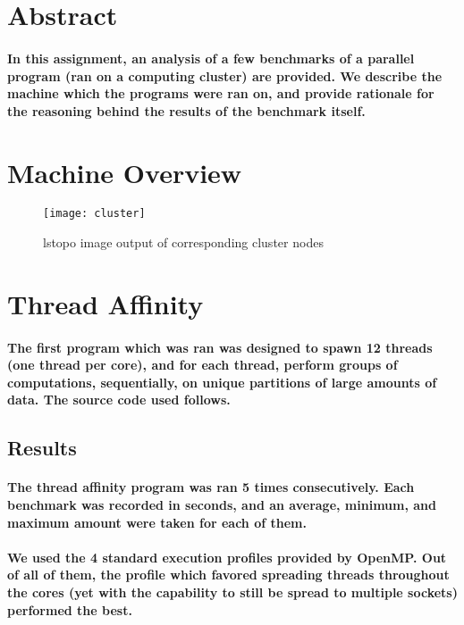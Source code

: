 \documentclass[8pt, a4paper, twoside, twoclumn, english]{extreport}
\begin{document}
\section {Abstract}

\paragraph{
In this assignment, an analysis of a few benchmarks of a parallel program (ran on a computing cluster) are provided.
We describe the machine which the programs were ran on, and provide rationale for the reasoning behind the results
of the benchmark itself.}

\section {Machine Overview}

\begin{figure}[h]
\caption{lstopo image output of corresponding cluster nodes}
\centering
\texttt{[image: cluster]}
\end{figure}


\twocolumn
\section {Thread Affinity}

\paragraph {The first program which was ran was designed to spawn 12 threads (one thread per core), and for each thread,
perform groups of computations, sequentially, on unique partitions of large amounts of data. The source code used follows.}

\subsection{Results}

\paragraph{The thread affinity program was ran 5 times consecutively.
  Each benchmark was recorded in seconds, and an average, minimum,
  and maximum amount were taken for each of them. }

\paragraph{We used the 4 standard execution profiles provided by OpenMP. Out of all of them,
  the profile which favored spreading threads throughout the cores (yet with the capability to still be spread to multiple sockets)
  performed the best.}
\end{document}
